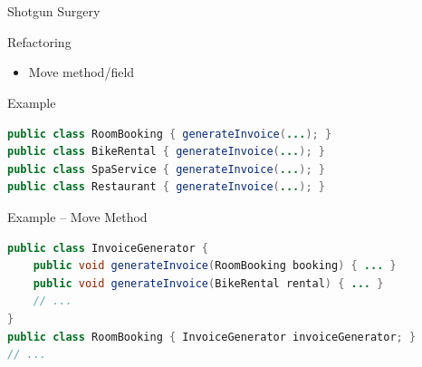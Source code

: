 \begin{frame}[fragile]
	\frametitle{\insertsubsection\ } %
	\begin{fancycolumns}
		\begin{definition}{Shotgun Surgery}
			\small
		\end{definition}
		\begin{definition}{Refactoring}
			\begin{itemize}
				\item Move method/field
			\end{itemize}
		\end{definition}
		\nextcolumn
		\begin{example}{Example}
			\begin{lstlisting}[language=Java, basicstyle=\small]
public class RoomBooking { generateInvoice(...); }
public class BikeRental { generateInvoice(...); }
public class SpaService { generateInvoice(...); }
public class Restaurant { generateInvoice(...); }
			\end{lstlisting}
		\end{example}

		\begin{example}{Example -- Move Method}
			\vspace{-3mm}
			\begin{lstlisting}[language=Java, basicstyle=\small]
public class InvoiceGenerator {
	public void generateInvoice(RoomBooking booking) { ... }
	public void generateInvoice(BikeRental rental) { ... }
	// ...
}
public class RoomBooking { InvoiceGenerator invoiceGenerator; }
// ...
			\end{lstlisting}
			\vspace{-3mm}
		\end{example}
	\end{fancycolumns}
\end{frame}

